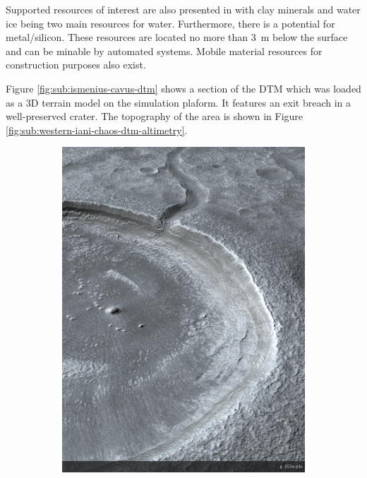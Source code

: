 Supported resources of interest are also presented in  with clay minerals and water ice being two main resources for water. Furthermore, there is a potential for metal/silicon. These resources are located no more than \SI{3}{\meter} below the surface and can be minable by automated systems. Mobile material resources for construction purposes also exist.

Figure \ref{fig:sub:ismenius-cavus-dtm} shows a section of the \ac{DTM} which was loaded as a 3D terrain model on the simulation plaform. It features an exit breach in a well-preserved crater. The topography of the area is shown in Figure \ref{fig:sub:western-iani-chaos-dtm-altimetry}.
\vspace{0.5cm}

\begin{figure}[h]
\captionsetup[subfigure]{justification=centering}
\vspace{-2ex}
	\centering
    \setlength{\subfigureWidth}{0.50\textwidth}
    \setlength{\graphicsHeight}{100mm}
    \hypersetup{hidelinks=true}%
    \begin{subfigure}[t]{\subfigureWidth}
        \centering
        \includegraphics[height=\graphicsHeight]{sections/mission-sites/images/ismenius-cavus-dtm.png}

\end{subfigure}
\end{figure}
